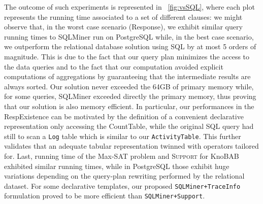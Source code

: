 The outcome of such experiments is represented in \figurename~\ref{fig:vsSQL}, where each plot represents the running time associated to a set of different clauses: we might observe that, in the worst case scenario (\textsf{Response}), we exhibit similar query running times to SQLMiner run on PostgreSQL while, in the best case scenario, we outperform the relational database solution using SQL by at most 5 orders of magnitude. This is due to the fact that our query plan minimizes the access to the data queries and to the fact that our computation avoided explicit computations of aggregations by guaranteeing that the intermediate results are always sorted. Our solution never exceeded the 64GB of primary memory while, for some queries, SQLMiner exceeded directly the primary memory, thus proving that our solution is also memory efficient. In particular, our performances in the RespExistence can be motivated by the definition of a convenient declarative representation only accessing the \textsf{CountTable}, while the original SQL query had still to scan a \texttt{Log} table which is similar to our \texttt{ActivityTable}. This further validates that an adequate tabular representation twinned with operators tailored for. Last, running time of the Max-SAT problem and \textsc{Support} for KnoBAB exhibited similar running times, while in PostgreSQL those exhibit huge variations depending on the query-plan rewriting performed by the relational dataset. For some declarative templates, our proposed \texttt{SQLMiner+TraceInfo} formulation proved to be more efficient than \texttt{SQLMiner+Support}.


